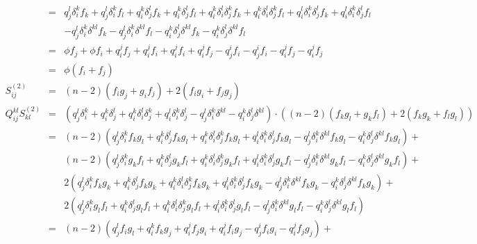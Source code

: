 \documentclass{article}
\begin{document}
\begin{eqnarray*}
  &=& q_j^l\delta_i^kf_k + q_j^l\delta_i^kf_l + 
      q_i^k\delta_j^lf_k + q_i^k\delta_j^lf_l + 
      q_i^k\delta_i^l\delta_j^kf_k + q_i^k\delta_i^l\delta_j^kf_l +     
      q_i^l\delta_i^k\delta_j^lf_k + q_i^l\delta_i^k\delta_j^lf_l \\
      && - q_j^l\delta_i^k\delta^{kl}f_k - q_j^l\delta_i^k\delta^{kl}f_l    
      - q_i^k\delta_j^l\delta^{kl}f_k - q_i^k\delta_j^l\delta^{kl}f_l\\
  &=& \phi f_j + \phi f_i + 
      q_i^jf_j + q_i^jf_i +     
      q_i^jf_i + q_i^jf_j 
      - q_j^if_i - q_j^if_i - q_i^jf_j - q_i^jf_j\\
  &=& \phi (f_i + f_j)
\\
  S_{ij}^{(2)} &=& (n - 2)(f_ig_j + g_if_j) + 2(f_ig_i + f_jg_j)
\\
  Q_{ij}^{kl}S_{kl}^{(2)} &=& 
                \left(  q_j^l\delta_i^k + 
                        q_i^k\delta_j^l + 
                        q_i^k\delta_i^l\delta_j^k +
                        q_i^l\delta_i^k\delta_j^l -
                        q_j^l\delta_i^k\delta^{kl} -    
                        q_i^k\delta_j^l\delta^{kl}\right)
        \cdot  \left((n-2)(f_kg_l + g_kf_l) + 2(f_kg_k + f_lg_l)\right)\\
&=& (n-2)(q_j^l\delta_i^kf_kg_l + 
          q_i^k\delta_j^lf_kg_l + 
          q_i^k\delta_i^l\delta_j^kf_kg_l +
          q_i^l\delta_i^k\delta_j^lf_kg_l -
          q_j^l\delta_i^k\delta^{kl}f_kg_l -    
          q_i^k\delta_j^l\delta^{kl}f_kg_l)+\\
&&  (n-2)(q_j^l\delta_i^kg_kf_l + 
          q_i^k\delta_j^lg_kf_l + 
          q_i^k\delta_i^l\delta_j^kg_kf_l +
          q_i^l\delta_i^k\delta_j^lg_kf_l -
          q_j^l\delta_i^k\delta^{kl}g_kf_l -    
          q_i^k\delta_j^l\delta^{kl}g_kf_l) +\\
&&       2(q_j^l\delta_i^kf_kg_k + 
          q_i^k\delta_j^lf_kg_k + 
          q_i^k\delta_i^l\delta_j^kf_kg_k +
          q_i^l\delta_i^k\delta_j^lf_kg_k -
          q_j^l\delta_i^k\delta^{kl}f_kg_k -    
          q_i^k\delta_j^l\delta^{kl}f_kg_k)+\\
&&       2(q_j^l\delta_i^kg_lf_l + 
          q_i^k\delta_j^lg_lf_l + 
          q_i^k\delta_i^l\delta_j^kg_lf_l +
          q_i^l\delta_i^k\delta_j^lg_lf_l -
          q_j^l\delta_i^k\delta^{kl}g_lf_l -    
          q_i^k\delta_j^l\delta^{kl}g_lf_l)\\
&=& (n-2)(q_j^lf_ig_l + 
          q_i^kf_kg_j + 
          q_i^jf_jg_i +
          q_i^jf_ig_j -
          q_j^if_ig_i -    
          q_i^jf_jg_j)+\\

\end{eqnarray*}
\end{document}
